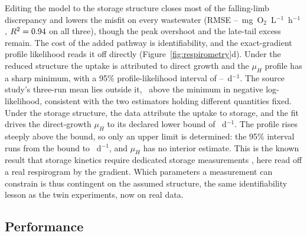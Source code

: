 \documentclass{article}
\begin{document}
Editing the model to the storage structure closes most of the falling-limb discrepancy and lowers the misfit on every wastewater (RMSE \RespStRmseLo--\RespStRmseHi~mg~O\(_2\)~L\(^{-1}\)~h\(^{-1}\), \(R^2=0.94\) on all three), though the peak overshoot and the late-tail excess remain. The cost of the added pathway is identifiability, and the exact-gradient profile likelihood reads it off directly (Figure~\ref{fig:respirometry}d). Under the reduced structure the uptake is attributed to direct growth and the \(\mu_H\) profile has a sharp minimum, with a 95\% profile-likelihood interval of \RespProfLoDr--\RespProfHiDr~d\(^{-1}\). The source study's three-run mean lies outside it, \RespProfRepRise\ above the minimum in negative log-likelihood, consistent with the two estimators holding different quantities fixed. Under the storage structure, the data attribute the uptake to storage, and the fit drives the direct-growth \(\mu_H\) to its declared lower bound of \RespStMuBound~d\(^{-1}\). The profile rises steeply above the bound, so only an upper limit is determined: the 95\% interval runs from the bound to \RespProfHiSt~d\(^{-1}\), and \(\mu_H\) has no interior estimate. This is the known result that storage kinetics require dedicated storage measurements \citep{guisasola2005}, here read off a real respirogram by the gradient. Which parameters a measurement can constrain is thus contingent on the assumed structure, the same identifiability lesson as the twin experiments, now on real data.

\subsection{Performance}
\label{sec:results-performance}
\end{document}

